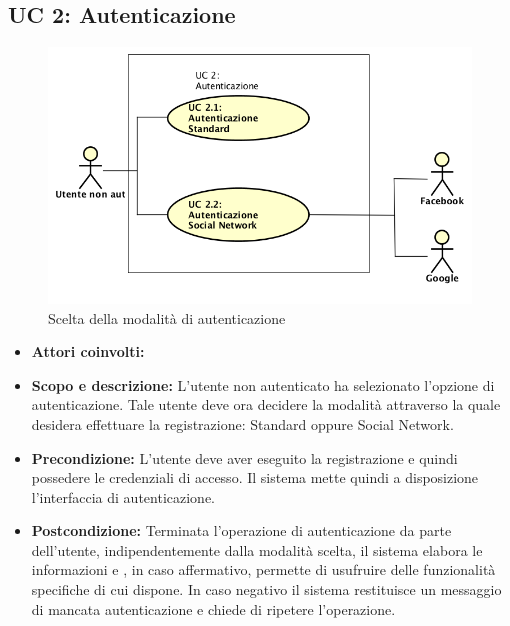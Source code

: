 \subsection{UC 2: Autenticazione}
	\begin{figure}[h]
		\centering
		\includegraphics[scale=0.6]{../../Casi D'uso/UC2.png}
		\caption{Scelta della modalità di autenticazione}
	\end{figure}
	\begin{itemize}
		\item \textbf{Attori coinvolti:}
		\item \textbf{Scopo e descrizione:} L'utente non autenticato ha selezionato l'opzione di autenticazione. Tale utente deve ora decidere la modalità attraverso la quale desidera effettuare la registrazione: Standard oppure Social Network. \\
		\item \textbf{Precondizione:} L'utente deve aver eseguito la registrazione e quindi possedere le credenziali di accesso. Il sistema mette quindi a disposizione l'interfaccia di autenticazione. \\
		\item \textbf{Postcondizione:} Terminata l'operazione di autenticazione da parte dell'utente, indipendentemente dalla modalità scelta, il sistema elabora le informazioni e , in caso affermativo, permette di usufruire delle funzionalità specifiche di cui dispone. In caso negativo il sistema restituisce un messaggio di mancata autenticazione e chiede di ripetere l'operazione. \\
	\end{itemize}
